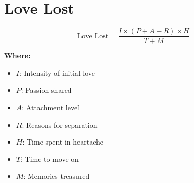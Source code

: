 \chapter{Love Lost}

\begin{equation}
\text{Love Lost} = \frac{I \times (P + A - R) \times H}{T + M}
\end{equation}

\textbf{Where:}

\begin{itemize}
    \item $I$: Intensity of initial love
    \item $P$: Passion shared
    \item $A$: Attachment level
    \item $R$: Reasons for separation
    \item $H$: Time spent in heartache
    \item $T$: Time to move on
    \item $M$: Memories treasured
\end{itemize}